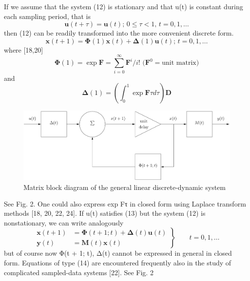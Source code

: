 \documentclass{article}
\begin{document}
If we assume that the system (12) is stationary and that u(t) is
constant during each sampling period, that is
\begin{equation}
\label{eq13}
\mathbf{u}(t+\tau)=\mathbf{u}(t)\text{; }0 \le \tau < 1\text{, }t=0,1,\dotsc
\end{equation}
then (12) can be readily transformed into the more convenient
discrete form.
\begin{equation*}
\mathbf{x}(t+1)=\boldsymbol{\Phi}(1)\mathbf{x}(t)+\boldsymbol{\Delta}(1)\mathbf{u}(t)\text{; }t=0,1,\dotsc
\end{equation*}
where [18,20]
\begin{equation*}
\boldsymbol{\Phi}(1)=\exp\mathbf{F}=\sum^\infty_{i=0}\mathbf{F}^i/i!\text{ (}\mathbf{F}^0=\text{unit matrix}\text{)}
\end{equation*}
and
\begin{equation*}
\boldsymbol{\Delta}(1)=\left(\int^1_0 \exp\mathbf{F}\tau d \tau\right)\mathbf{D}
\end{equation*}
\begin{figure}[htbp]
\centering
\includegraphics[width=0.5\paperwidth]{fig/fg2.pdf}
\caption{Matrix block diagram of the general linear discrete-dynamic system}
\label{fg2}
\end{figure}
See Fig. 2. One could also express exp Fτ in closed form using
Laplace transform methods [18, 20, 22, 24]. If u(t) satisfies (13)
but the system (12) is nonstationary, we can write analogously
\begin{equation}
\label{eq14}
\left.\begin{aligned}
\mathbf{x}(t+1)&=\boldsymbol{\Phi}(t+1;t)+\boldsymbol{\Delta}(t)\mathbf{u}(t)\\
\mathbf{y}(t)&=\mathbf{M}(t)\mathbf{x}(t)
\end{aligned}\right\}
\qquad t=0,1,\dotsc
\end{equation}
but of course now Φ(t + 1; t), Δ(t) cannot be expressed in general
in closed form. Equations of type (14) are encountered frequently
also in the study of complicated sampled-data systems
[22]. See Fig. 2
\end{document}
